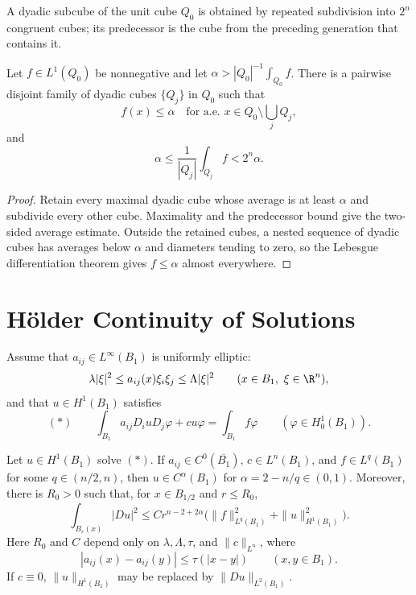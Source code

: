 A dyadic subcube of the unit cube $Q_0$ is obtained by repeated subdivision
into $2^n$ congruent cubes; its predecessor is the cube from the preceding
generation that contains it.

\begin{lemma}\label{hanlin:weaksol-part1-cz}
Let $f\in L^1(Q_0)$ be nonnegative and let
$\alpha>|Q_0|^{-1}\int_{Q_0}f$. There is a pairwise disjoint family of
dyadic cubes $\{Q_j\}$ in $Q_0$ such that
\[
f(x)\leq\alpha\quad\text{for a.e. }x\in Q_0\setminus\bigcup_jQ_j,
\]
and
\[
\alpha\leq\frac1{|Q_j|}\int_{Q_j}f<2^n\alpha.
\]
\end{lemma}
\begin{proof}
\sketch Retain every maximal dyadic cube whose average is at least $\alpha$
and subdivide every other cube. Maximality and the predecessor bound give the
two-sided average estimate. Outside the retained cubes, a nested sequence of
dyadic cubes has averages below $\alpha$ and diameters tending to zero, so the
Lebesgue differentiation theorem gives $f\leq\alpha$ almost everywhere.
\end{proof}

\section{H\"older Continuity of Solutions}

Assume that $a_{ij}\in L^\infty(B_1)$ is uniformly elliptic:
\[
\lambda|\xi|^2\leq a_{ij}(x)\xi_i\xi_j\leq\Lambda|\xi|^2
\qquad(x\in B_1,\ \xi\in\R^n),
\]
and that $u\in H^1(B_1)$ satisfies
\[
(\ast)\qquad
\int_{B_1}a_{ij}D_i uD_j\varphi+cu\varphi
=\int_{B_1}f\varphi
\qquad(\varphi\in H^1_0(B_1)).
\]

\begin{theorem}\label{hanlin:weaksol-part1-holder-sol}
Let $u\in H^1(B_1)$ solve $(\ast)$. If
$a_{ij}\in C^0(\overline{B_1})$, $c\in L^n(B_1)$, and
$f\in L^q(B_1)$ for some $q\in(n/2,n)$, then
$u\in C^\alpha(B_1)$ for $\alpha=2-n/q\in(0,1)$.
Moreover, there is $R_0>0$ such that, for $x\in B_{1/2}$ and $r\leq R_0$,
\[
\int_{B_r(x)}|Du|^2
\leq Cr^{n-2+2\alpha}
\bigl(\|f\|_{L^q(B_1)}^2+\|u\|_{H^1(B_1)}^2\bigr).
\]
Here $R_0$ and $C$ depend only on $\lambda,\Lambda,\tau$, and
$\|c\|_{L^n}$, where
\[
|a_{ij}(x)-a_{ij}(y)|\leq\tau(|x-y|)
\qquad(x,y\in B_1).
\]
If $c\equiv0$, $\|u\|_{H^1(B_1)}$ may be replaced by
$\|Du\|_{L^2(B_1)}$.
\end{theorem}

